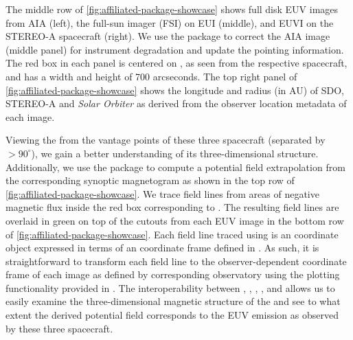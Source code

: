 The middle row of \autoref{fig:affiliated-package-showcase} shows full disk EUV images from AIA (left), the full-sun imager (FSI) on EUI (middle), and EUVI on the STEREO-A spacecraft (right).
We use the \aiapypkg package to correct the AIA image (middle panel) for instrument degradation and update the pointing information.
The red box in each panel is centered on , as seen from the respective spacecraft, and has a width and height of 700 arcseconds.
The top right panel of \autoref{fig:affiliated-package-showcase} shows the \hgs longitude and radius (in AU) of SDO, STEREO-A and \textit{Solar Orbiter} as derived from the observer location metadata of each image.

Viewing the \AR from the vantage points of these three spacecraft (separated by $>90^{\circ}$), we gain a better understanding of its three-dimensional structure.
Additionally, we use the  package to compute a potential field extrapolation from the corresponding synoptic magnetogram as shown in the top row of \autoref{fig:affiliated-package-showcase}.
We trace field lines from areas of negative magnetic flux inside the red box corresponding to .
The resulting field lines are overlaid in green on top of the cutouts from each EUV image in the bottom row of \autoref{fig:affiliated-package-showcase}.
Each field line traced using  is an \astropypkg coordinate object expressed in terms of an \hgc coordinate frame defined in \sunpypkg.
As such, it is straightforward to transform each field line to the observer-dependent coordinate frame of each image as defined by corresponding observatory using the plotting functionality provided in \astropypkg.
The interoperability between \astropypkg, \sunpypkg, , \aiapypkg, and  allows us to easily examine the three-dimensional magnetic structure of the \AR and see to what extent the derived potential field corresponds to the EUV emission as observed by these three spacecraft.
